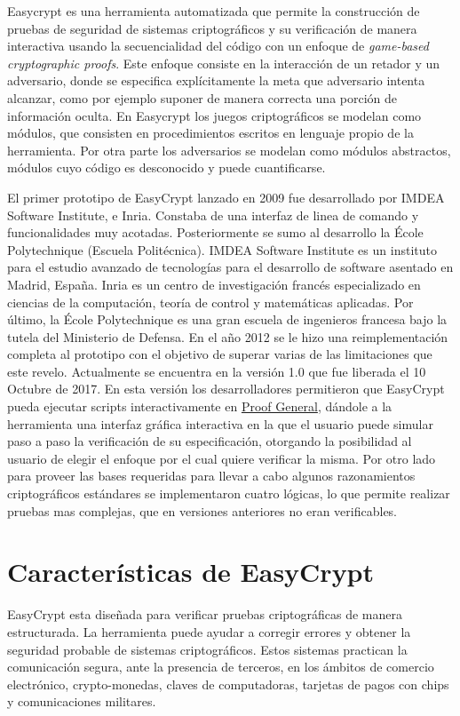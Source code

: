 \documentclass[runningheads]{llncs}
\begin{document}
Easycrypt es una herramienta automatizada que permite la construcción de pruebas de seguridad de sistemas criptográficos y su verificación de manera interactiva usando la secuencialidad del código con un enfoque de \textit{game-based cryptographic proofs}. Este enfoque consiste en la interacción de un retador y un adversario, donde se especifica explícitamente la meta que adversario intenta alcanzar, como por ejemplo suponer de manera correcta una porción de información oculta. En Easycrypt los juegos criptográficos se modelan como módulos, que consisten en procedimientos escritos en lenguaje propio de la herramienta. Por otra parte los adversarios se modelan como módulos abstractos, módulos cuyo código es desconocido y puede cuantificarse.

El primer prototipo de EasyCrypt lanzado en 2009 fue desarrollado por IMDEA Software Institute, e Inria. Constaba de una interfaz de linea 	de comando y funcionalidades muy acotadas. Posteriormente se sumo al desarrollo la École Polytechnique (Escuela Politécnica). IMDEA Software Institute es un instituto para el estudio avanzado de tecnologías para el desarrollo de software asentado en Madrid, España. Inria es un centro de investigación francés especializado en ciencias de la computación, teoría de control y matemáticas aplicadas. Por último, la École Polytechnique es una gran escuela de ingenieros francesa bajo la tutela del Ministerio de Defensa. En el año 2012 se le hizo una reimplementación completa al prototipo con el objetivo de superar varias de las limitaciones que este revelo. Actualmente se encuentra en la versión 1.0 que fue liberada el 10 Octubre de 2017. En esta versión los desarrolladores permitieron que EasyCrypt pueda ejecutar scripts interactivamente en \href{https://proofgeneral.github.io}{Proof General}, dándole a la herramienta una interfaz gráfica interactiva en la que el usuario puede simular paso a paso la verificación de su especificación, otorgando la posibilidad al usuario de elegir el enfoque por el cual quiere verificar la misma. Por otro lado para proveer las bases requeridas para llevar a cabo algunos razonamientos criptográficos estándares se implementaron cuatro lógicas, lo que permite realizar pruebas mas complejas, que en versiones anteriores no eran verificables.

\section{Características de EasyCrypt}

EasyCrypt esta diseñada para verificar pruebas criptográficas de manera estructurada. La herramienta puede ayudar a corregir errores y obtener la seguridad probable de sistemas criptográficos. Estos sistemas practican la comunicación segura, ante la presencia de terceros, en los ámbitos de comercio electrónico, crypto-monedas, claves de computadoras, tarjetas de pagos con chips y comunicaciones militares.
\end{document}
